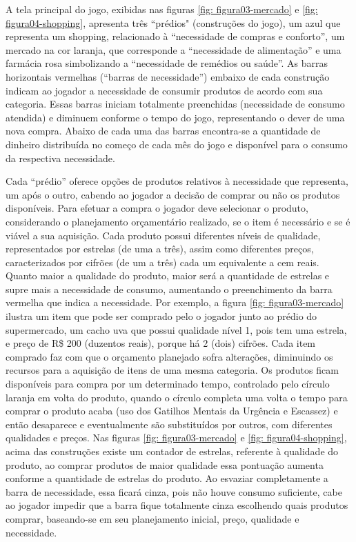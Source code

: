 A tela principal do jogo, exibidas nas figuras \ref{fig: figura03-mercado} e \ref{fig: figura04-shopping}, apresenta três “prédios" (construções do jogo), um azul que representa um shopping, relacionado à “necessidade de compras e conforto”, um mercado na cor laranja, que corresponde a “necessidade de alimentação” e uma farmácia rosa simbolizando a “necessidade de remédios ou saúde”. As barras horizontais vermelhas (“barras de necessidade”) embaixo de cada construção indicam ao jogador a necessidade de consumir produtos de acordo com sua categoria. Essas barras iniciam totalmente preenchidas (necessidade de consumo atendida) e diminuem conforme o tempo do jogo, representando o dever de uma nova compra. Abaixo de cada uma das barras encontra-se a quantidade de dinheiro distribuída no começo de cada mês do jogo e disponível para o consumo da respectiva necessidade.

Cada “prédio” oferece opções de produtos relativos à necessidade que representa, um após o outro, cabendo ao jogador a decisão de comprar ou não os produtos disponíveis. Para efetuar a compra o jogador deve selecionar o produto, considerando o planejamento orçamentário realizado, se o item é necessário e se é viável a sua aquisição. Cada produto possui diferentes níveis de qualidade, representados por estrelas (de uma a três), assim como diferentes preços, caracterizados por cifrões (de um a três) cada um equivalente a cem reais. Quanto maior a qualidade do produto, maior será a quantidade de estrelas e supre mais a necessidade de consumo, aumentando o preenchimento da barra vermelha que indica a necessidade. Por exemplo, a figura \ref{fig: figura03-mercado} ilustra um item que pode ser comprado pelo o jogador junto ao prédio do supermercado, um cacho uva que possui qualidade nível 1, pois tem uma estrela, e preço de R\$ 200 (duzentos reais), porque há 2 (dois) cifrões. Cada item comprado faz com que o orçamento planejado sofra alterações, diminuindo os recursos para a aquisição de itens de uma mesma categoria. Os produtos ficam disponíveis para compra por um determinado tempo, controlado pelo círculo laranja em volta do produto, quando o círculo completa uma volta o tempo para comprar o produto acaba (uso dos Gatilhos Mentais da Urgência e Escassez) e então desaparece e eventualmente são substituídos por outros, com diferentes qualidades e preços. Nas figuras \ref{fig: figura03-mercado} e \ref{fig: figura04-shopping}, acima das construções existe um contador de estrelas, referente à qualidade do produto, ao comprar produtos de maior qualidade essa pontuação aumenta conforme a quantidade de estrelas do produto. Ao esvaziar completamente a barra de necessidade, essa ficará cinza, pois não houve consumo suficiente, cabe ao jogador impedir que a barra fique totalmente cinza escolhendo quais produtos comprar, baseando-se em seu planejamento inicial, preço, qualidade e necessidade.

